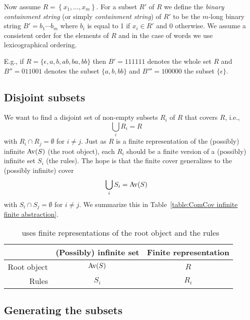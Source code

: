 Now assume $R = \left\{ x_1, \ldots, x_m \right\}$. For a subset $R'$ of $R$ we 
define the \emph{binary containment string} (or simply \emph{containment 
string}) of $R'$ to be the $m$-long binary string $B' = b_1 \cdots b_m$ where 
$b_i$ is equal to 1 if $x_i \in R'$ and 0 otherwise. We assume a consistent 
order for the elements of $R$ and in the case of words we use lexicographical 
ordering.

E.g., if $R = \{\epsilon, a, b, ab, ba, bb\}$ then $B' = 111111$ denotes the 
whole set $R$ and $B'' = 011001$ denotes the subset $\{a, b, bb\}$ and $B''' = 
100000$ the subset $\{\epsilon\}$.


\subsection{Disjoint subsets}

We want to find a disjoint set of non-empty subsets $R_i$ of $R$ that covers 
$R$, i.e., \[\bigcup_i R_i = R\] with $R_i \cap R_j = \emptyset$ for $i \neq j$. 
Just as $R$ is a finite representation of the (possibly) infinite ${\mathrm{Av}\!\left(S\right)}$ (the 
root object), each $R_i$ should be a finite version of a (possibly) infinite set 
$S_i$ (the rules). The hope is that the finite cover generalizes to the 
(possibly infinite) cover \[\bigcup_i S_i = {\mathrm{Av}\!\left(S\right)}\] with $S_i \cap S_j = 
\emptyset$ for $i \neq j$. We summarize this in Table~\ref{table:ComCov infinite 
finite abstraction}.

\begin{table}[ht]
    \centering
    \begin{tabular}{ | r || c | c | }
        \hline
         & (Possibly) infinite set & Finite representation \\
        \hline\hline
        Root object & ${\mathrm{Av}\!\left(S\right)}$ & $R$   \\ \hline
        Rules       & $S_i$    & $R_i$ \\ \hline
    \end{tabular}
    \caption{\CombCov\ uses finite representations of the root object and the rules}
    \label{table:ComCov infinite finite abstraction}
\end{table}


\subsection{Generating the subsets}

